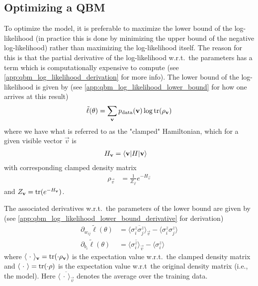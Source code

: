\subsection{Optimizing a QBM}
To optimize the model, it is preferable to maximize the lower bound of the log-likelihood (in practice this is done by minimizing the upper bound of the negative log-likelihood) rather than maximizing the log-likelihood itself.
The reason for this is that the partial derivative of the log-likelihood w.r.t.\ the parameters has a term which is computationally expensive to compute (see \cref{app:qbm_log_likelihood_derivation} for more info).
The lower bound of the log-likelihood is given by (see \cref{app:qbm_log_likelihood_lower_bound} for how one arrives at this result)
\begin{align}
    \tilde{\ell}(\theta) = \sum_{\mathbf{v}} p_{\text{data}}(\mathbf{v}) \log \text{tr}(\rho_{\mathbf{v}})
\end{align}
where we have what is referred to as the "clamped" Hamiltonian, which for a given visible vector \( \vec{v} \) is
\begin{align}
    H_{\mathbf{v}}
        &= \braket{\mathbf{v}|H|\mathbf{v}}
\end{align}
with corresponding clamped density matrix
\begin{align}
    \rho_\vec{v}
        &= \frac{1}{Z_\vec{v}} e^{-H_\vec{v}}
\end{align}
and \( Z_{\mathbf{v}} = \text{tr}(e^{-H_{\mathbf{v}}}) \).

The associated derivatives w.r.t.\ the parameters of the lower bound are given by (see \cref{app:qbm_log_likelihood_lower_bound_derivative} for derivation)
\begin{align}
    \partial_{w_{ij}} \tilde{\ell}(\theta)
        &= \overline{\langle \sigma_i^z \sigma_j^z \rangle_\vec{v}} - \langle \sigma_i^z \sigma_j^z \rangle \\
    \partial_{b_i} \tilde{\ell}(\theta)
        &= \overline{\langle \sigma_i^z \rangle_\vec{v}} - \langle \sigma_i^z \rangle
\end{align}
where \( \langle \ \cdot \ \rangle_{\mathbf{v}} = \text{tr}(\cdot \rho_{\mathbf{v}}) \) is the expectation value w.r.t.\ the clamped density matrix and \( \langle \ \cdot \ \rangle = \text{tr}(\cdot \rho) \) is the expectation value w.r.t\ the original density matrix (i.e., the model).
Here \( \overline{\langle \ \cdot \ \rangle_\vec{v}} \) denotes the average over the training data.

